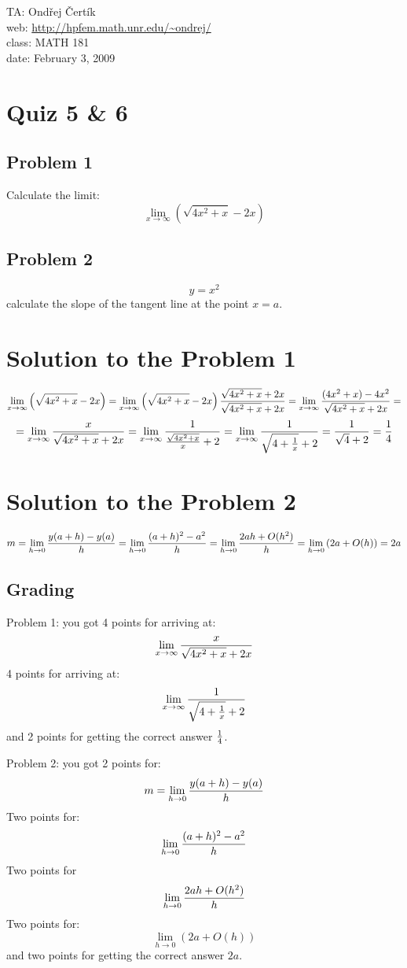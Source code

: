 \documentclass[10pt]{article}
\begin{document}
\noindent TA: Ondřej Čertík\\
web: \url{http://hpfem.math.unr.edu/~ondrej/}\\
class: MATH 181\\
date: February 3, 2009

\section*{Quiz 5 \& 6}

\subsection*{Problem 1}

Calculate the limit:
$$\lim_{x\to\infty}\left(\sqrt{4x^2+x}-2x\right)$$

\subsection*{Problem 2}

$$y=x^2$$
calculate the slope of the tangent line at the point $x=a$.

\section*{Solution to the Problem 1}

$$\lim_{x\to\infty}\left(\sqrt{4x^2+x}-2x\right)=
\lim_{x\to\infty}\left(\sqrt{4x^2+x}-2x\right)
{\sqrt{4x^2+x}+2x\over\sqrt{4x^2+x}+2x}=
\lim_{x\to\infty}{(4x^2+x)-4x^2
\over\sqrt{4x^2+x}+2x}=
$$
$$
=
\lim_{x\to\infty}{x\over\sqrt{4x^2+x}+2x}=
\lim_{x\to\infty}{1\over{\sqrt{4x^2+x}\over x}+2}=
\lim_{x\to\infty}{1\over{\sqrt{4+{1\over x}}+2}}=
{1\over{\sqrt{4}+2}}={1\over4}
$$

\section*{Solution to the Problem 2}

$$m = \lim_{h\to0}{y(a+h)-y(a)\over h}=
\lim_{h\to0}{(a+h)^2-a^2\over h}=
\lim_{h\to0}{2ah +O(h^2)\over h}=
\lim_{h\to0}\left({2a +O(h)}\right)=2a
$$

\subsection*{Grading}

Problem 1: you got 4 points for arriving at:
$$\lim_{x\to\infty}{x\over\sqrt{4x^2+x}+2x}$$
4 points for arriving at:
$$\lim_{x\to\infty}{1\over{\sqrt{4+{1\over x}}+2}}$$
and 2 points for getting the correct answer $1\over4$.

Problem 2: you got 2 points for:
$$m = \lim_{h\to0}{y(a+h)-y(a)\over h}$$
Two points for:
$$
\lim_{h\to0}{(a+h)^2-a^2\over h}
$$
Two points for
$$
\lim_{h\to0}{2ah +O(h^2)\over h}
$$
Two points for:
$$ \lim_{h\to0}\left({2a +O(h)}\right)$$
and two points for getting the correct answer $2a$.
\end{document}
